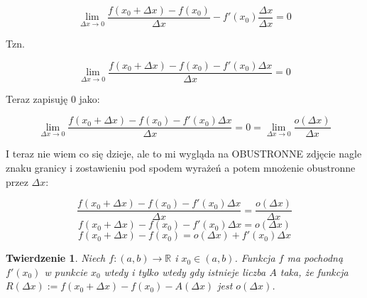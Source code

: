 \documentclass{article}
\newtheorem*{theorem}{Twierdzenie}
\begin{document}
\begin{equation*}
    \lim_{\Delta x \to 0} \frac{f(x_0 + \Delta x) - f(x_0)}{\Delta x} - f'(x_0)\frac{\Delta x}{\Delta x} = 0
\end{equation*}

Tzn.

\begin{equation*}
    \lim_{\Delta x \to 0} \frac{f(x_0 + \Delta x) - f(x_0) - f'(x_0)\Delta x}{\Delta x} = 0
\end{equation*}

Teraz zapisuję \(0\) jako:

\begin{equation*}
    \lim_{\Delta x \to 0} \frac{f(x_0 + \Delta x) - f(x_0) - f'(x_0)\Delta x}{\Delta x} = 0 = \lim_{\Delta x \to 0} \frac{o(\Delta x)}{\Delta x}
\end{equation*}

I teraz nie wiem co się dzieje, ale to mi wygląda na OBUSTRONNE zdjęcie nagle znaku granicy i zostawieniu pod spodem wyrażeń a potem mnożenie obustronne przez \(\Delta x\):

\begin{equation*}
    \frac{f(x_0 + \Delta x) - f(x_0) - f'(x_0)\Delta x}{\Delta x} = \frac{o(\Delta x)}{\Delta x} 
\end{equation*}
\begin{equation*}
    f(x_0 + \Delta x) - f(x_0) - f'(x_0)\Delta x = o(\Delta x)
\end{equation*}
\begin{equation*}
    f(x_0 + \Delta x) - f(x_0) = o(\Delta x) + f'(x_0)\Delta x
\end{equation*}

\newpage
\begin{theorem}
    Niech \(f: (a, b) \rightarrow \mathbb{R}\) i \(x_0 \in (a, b)\). Funkcja \(f\) ma pochodną \(f'(x_0)\) w punkcie \(x_0\) wtedy i tylko wtedy
    gdy istnieje liczba $A$ taka, że funkcja \(R(\Delta x) := f(x_0 + \Delta x) - f(x_0) - A(\Delta x)\) jest \(o(\Delta x)\).
\end{theorem}
\end{document}
